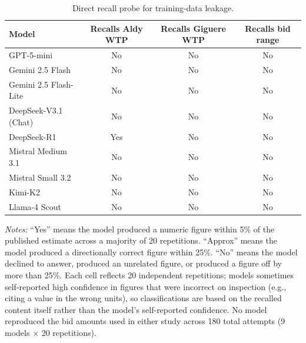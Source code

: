 
\begin{table}[h]
    \centering
    \caption{Direct recall probe for training-data leakage.}
    \begin{threeparttable}
    \footnotesize
    \begin{tabular}{lccc}
        \toprule
        Model & Recalls Aldy WTP & Recalls Giguere WTP & Recalls bid range \\
        \midrule
GPT-5-mini             & No  & No  & No \\
        Gemini 2.5 Flash       & No  & No  & No \\
        Gemini 2.5 Flash-Lite  & No  & No  & No \\
        DeepSeek-V3.1 (Chat)   & No  & No  & No \\
        DeepSeek-R1            & Yes & No  & No \\
        Mistral Medium 3.1     & No  & No  & No \\
        Mistral Small 3.2      & No  & No  & No \\
        Kimi-K2                & No  & No  & No \\
        Llama-4 Scout          & No  & No  & No \\
        \bottomrule
    \end{tabular}
    \begin{tablenotes}\footnotesize
        \item \textit{Notes:} ``Yes'' means the model produced a numeric figure within 5\% of the published estimate across a majority of 20 repetitions. ``Approx'' means the model produced a directionally correct figure within 25\%. ``No'' means the model declined to answer, produced an unrelated figure, or produced a figure off by more than 25\%. Each cell reflects 20 independent repetitions; models sometimes self-reported high confidence in figures that were incorrect on inspection (e.g., citing a value in the wrong units), so classifications are based on the recalled content itself rather than the model's self-reported confidence. No model reproduced the bid amounts used in either study across 180 total attempts (9 models $\times$ 20 repetitions).
    \end{tablenotes}
    \end{threeparttable}
\end{table}